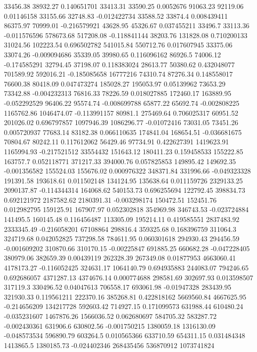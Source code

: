 33456.38	38932.27	0.140651701	33413.31	33590.25	0.0052676	91063.23	92119.06	0.01146158	33155.66	32748.83	-0.012422734	33588.52	33874.4	0.008439411	86375.97	70999.01	-0.216579921	43628.95	45326.67	0.037455211	33496.7	33113.36	-0.011576596	578673.68	517208.08	-0.118841144	38203.76	131828.08	0.710200133	31024.56	102223.54	0.696502782	541015.84	550712.76	0.017607945	33375.06	33074.26	-0.009094686	35339.05	39980.65	0.116096162	86926.5	74006.12	-0.174585291	32794.45	37198.07	0.118383024	28613.77	50380.62	0.432048077	701589.92	592016.21	-0.185085658	16777216
74310.74	87276.34	0.148558017	76600.38	80418.09	0.047473274	185028.27	195053.97	0.05139962	73653.29	73342.88	-0.004232313	76816.33	78226.59	0.018027885	172460.17	163889.95	-0.052292529	96406.22	95574.74	-0.008699788	65877.22	65692.74	-0.002808225	1165762.86	1046474.07	-0.113991157	80981.1	275469.64	0.706025317	60951.52	201026.02	0.696797857	1097946.39	1086296.77	-0.01072416	73031.05	73451.26	0.005720937	77683.14	83182.38	0.066110635	174841.04	168654.51	-0.036681675	70804.67	80242.11	0.117612062	56429.46	97734.91	0.422627391	1419623.91	1165994.93	-0.217521512	33554432
151643.12	180411.23	0.159458533	155222.85	163757.7	0.052118771	371217.33	394000.76	0.057825853	149895.42	149692.35	-0.001356582	155524.03	155676.02	0.000976322	348371.84	331996.66	-0.049323328	191391.58	193618.61	0.011502148	134124.95	135638.64	0.011159726	2329133.25	2090137.87	-0.114344314	164068.62	540153.73	0.696255694	122792.45	398834.73	0.692121972	2187582.62	2180391.31	-0.003298174	150472.51	152451.76	0.012982795	159125.91	167907.97	0.052302818	354969.98	346743.53	-0.023724884	141495.5	160145.48	0.116456487	113305.09	195214.11	0.419585551	2837483.92	2333345.49	-0.216058201	67108864
298816.4	359325.68	0.168396759	311064.3	324719.68	0.042052825	737298.58	784611.95	0.060301618	294930.43	294456.59	-0.001609202	310870.66	310170.15	-0.00225847	691885.25	660682.28	-0.047228405	380979.06	382659.39	0.00439119	262328.39	267349.08	0.01877953	4663060.41	4178173.27	-0.116052425	324631.17	1064140.79	0.694935883	244083.07	794246.65	0.692686057	4371287.13	4374676.14	0.000774688	298581.69	302697.93	0.013598507	317119.3	330496.52	0.04047613	706558.17	693061.98	-0.01947328	283439.95	321930.33	0.119561211	222370.16	385268.81	0.422818162	5669560.84	4667625.95	-0.214656209	134217728
592603.42	714927.15	0.171099573	631988.44	610480.24	-0.035231607	1467876.26	1566036.52	0.062680697	584705.32	583287.72	-0.002430361	631906.6	630802.56	-0.001750215	1380059.18	1316130.09	-0.048573534																			596890.79	603264.5	0.010565366	633710.59	654311.15	0.031484348	1413865.5	1380185.73	-0.024402346										268435456
																																																						536870912
																																																						1073741824
